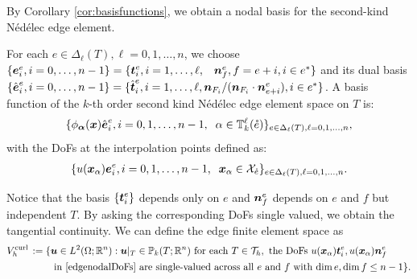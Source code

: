 \documentclass[mathpazo]{cicp}
\begin{document}
By Corollary \ref{cor:basisfunctions}, we obtain a nodal basis for the second-kind N\'ed\'elec edge element.

\begin{theorem}
For each $e\in \Delta_{\ell}(T), \ell = 0,1,\ldots, n$, we choose $\{\boldsymbol e_i^{e}, i=0,\ldots, n-1\} = \{ \boldsymbol t_i^e, i=1,\ldots, \ell, \; \; \; \boldsymbol n_{f}^e,  f= e+i, i\in e^*\}$ and its dual basis $\{\hat{\boldsymbol e}_i^{e}, i=0,\ldots, n-1\} = \{ \hat{\boldsymbol t}_i^e, i=1,\ldots, \ell, \boldsymbol n_{F_i}/ (\boldsymbol n_{F_i}\cdot \boldsymbol n^e_{e+i}), i\in e^*\}$.
A basis function of the $k$-th order second kind N\'ed\'elec edge element space on $T$ is:
$$
\{\phi_{\boldsymbol\alpha}(\boldsymbol x)\hat{\boldsymbol e}^e_{i},  i=0,1,\ldots, n-1, \; \;  \alpha \in \mathbb T_k^{\ell}(\mathring{e})\}_{e \in \Delta_{\ell}(T), \ell =0,1,\ldots, n},
$$
with the DoFs at the interpolation points defined as:
\begin{align}\label{edgenodalDoFs}
\{u(\boldsymbol x_{\alpha})\boldsymbol e^e_i,  i=0,1,\ldots, n-1, \; \;  \boldsymbol x_{\alpha} \in \mathcal X_{\mathring{e}} \}_{e \in \Delta_{\ell}(T), \ell =0,1,\ldots, n}.
\end{align}
\end{theorem}

Notice that the basis $\{\boldsymbol t^e_i\}$ depends only on $e$ and $\boldsymbol n_{f}^e$ depends on $e$ and $f$ but independent $T$. By asking the corresponding DoFs single valued, we obtain the tangential continuity. 
%
We can define the edge finite element space as
\begin{align*}
V_h^{{\rm curl\,}}:=\{&\boldsymbol u\in L^2(\Omega;\mathbb R^n): \boldsymbol u|_T\in\mathbb P_k(T; \mathbb R^n) \textrm{ for each } T\in\mathcal T_h, \textrm{ the DoFs } u(\boldsymbol x_{\alpha})\boldsymbol t^e_i, u(\boldsymbol x_{\alpha})\boldsymbol n^e_f \\
 &\text{ in \eqref{edgenodalDoFs} are single-valued across all $e$ and $f$ with $\dim e, \dim f \leq n-1$}\}.
\end{align*}

\end{document}
